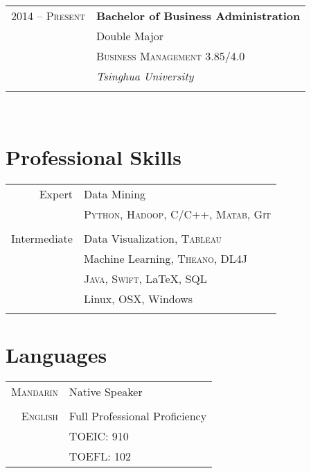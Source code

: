 \documentclass[10pt]{article} %
\begin{document}
{\begin{minipage}[t]{0.44\textwidth}
\begin{tabular}{rl}
2014 -- \textsc{Present} &  \textbf{Bachelor of Business Administration} \\ 
& \small Double Major \\
& \textsc{Business Management 3.85/4.0} \\ 
& \textit{Tsinghua University}\\
&\\


\end{tabular}\\[10pt]


\section{Professional Skills} 

\begin{tabular}{rl}
Expert
& Data Mining \\
& \textsc{Python}, \textsc{Hadoop}, \textsc{C/C++}, \textsc{Matab}, \textsc{Git} \\
& \\
Intermediate
& Data Visualization, \textsc{Tableau} \\
& Machine Learning, \textsc{Theano}, \textsc{DL4J} \\
& \textsc{Java}, \textsc{Swift}, \LaTeX, \textsc{SQL} \\
& Linux, OSX, Windows \\
\\
\end{tabular}


\section{Languages} 

\begin{tabular}{rl}
\textsc{Mandarin}
& Native Speaker \\
& \\
\textsc{English}
& Full Professional Proficiency \\
& \textsc{TOEIC}: 910 \\
& \textsc{TOEFL}: 102 \\
\end{tabular}\\[10pt]


\end{minipage}}
\end{document}
